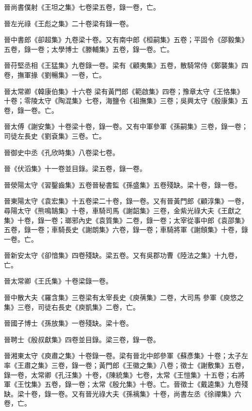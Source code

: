 \begin{pinyinscope}
 晉尚書僕射《王坦之集》七卷梁五卷，錄一卷，亡。



 晉左光祿《王彪之集》二十卷梁有錄一卷。



 晉中書郎《卻超集》九卷梁十卷。又有南中郎《桓嗣集》五卷；平固令《邵毅集》五卷，錄一卷；太學博士《滕輔集》五卷，錄一卷。亡。



 晉苻堅丞相《王猛集》九卷錄一卷。梁有《顧夷集》五卷，散騎常侍《鄭襲集》四卷，撫軍掾《劉暢集》一卷，亡。



 晉太常卿《韓康伯集》十六卷
 梁有黃門郎《範啟集》四卷；豫章太守《王恪集》十卷；零陵太守《陶混集》七卷，海鹽令《祖撫集》三卷；吳興太守《殷康集》五卷，錄一卷。亡。



 晉太傅《謝安集》十卷梁十卷，錄一卷。又有中軍參軍《孫嗣集》三卷，錄一卷；司徒左長史《劉袞集》三卷。亡。



 晉御史中丞《孔欣時集》八卷梁七卷。



 晉《伏滔集》十一卷並目錄。梁五卷，錄一卷。



 晉滎陽太守《習鑿齒集》五卷晉秘書監《孫盛集》五卷殘缺。梁十卷，錄一卷。



 晉東陽太守《袁宏集》十五卷梁二十卷，錄一卷。又有晉黃門郎《顧淳集》一卷，尋陽太守《熊鳴鵠集》十卷，車騎司馬《謝韶集》三卷，金紫光祿大夫《王獻之集》十卷，錄一卷；瑯邪內史《袁質集》二卷，錄一卷；太宰從事中郎《袁邵集》五卷，錄一卷；車騎長史《謝朗集》六卷，錄一卷；車騎將軍《謝頠集》十卷，錄一卷。亡。



 晉新安太守《卻愔集》四卷殘缺。梁五卷。又有吳郡功曹《陸法之集》十九卷，亡。



 晉太常卿《王氏集》十卷梁錄一卷。



 晉中散大夫《羅含集》三卷梁有太宰長史《庾蒨集》二卷，大司馬
 參軍《庾悠之集》三卷，司徒右長史《庾凱集》二卷，亡。



 晉國子博士《孫放集》一卷殘缺。梁十卷。



 晉聘士《殷叔獻集》四卷並目錄。梁三卷，錄一卷。



 晉湘東太守《庾肅之集》十卷錄一卷。梁有晉北中郎參軍《蘇彥集》十卷；太子左率《王肅之集》三卷，錄一卷；黃門郎《王徽之集》八卷；徵士《謝敷集》五卷，錄一卷，太常卿《孔汪集》十卷，《陳統集》七卷，太常《王愷集》十五卷；右將軍《王忱集》五卷，錄一卷；太常《殷允集》十卷。亡。晉徵士《戴逵集》九卷殘缺。梁十卷，錄一卷。又有晉光祿大夫《孫褵集》十卷，尚書左丞《徐禪集》六卷，亡。




\end{pinyinscope}
